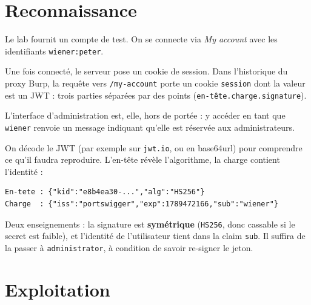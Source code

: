 \documentclass[11pt,a4paper]{article}
\begin{document}

\section{Reconnaissance}
Le lab fournit un compte de test. On se connecte via \emph{My account} avec les
identifiants \texttt{wiener:peter}.


Une fois connecté, le serveur pose un cookie de session. Dans l'historique du
proxy Burp, la requête vers \texttt{/my-account} porte un cookie
\texttt{session} dont la valeur est un JWT : trois parties séparées par des
points (\texttt{en-tête.charge.signature}).


L'interface d'administration est, elle, hors de portée : y accéder en tant que
\texttt{wiener} renvoie un message indiquant qu'elle est réservée aux
administrateurs.


On décode le JWT (par exemple sur \texttt{jwt.io}, ou en base64url) pour
comprendre ce qu'il faudra reproduire. L'en-tête révèle l'algorithme, la charge
contient l'identité :

\begin{lstlisting}
En-tete : {"kid":"e8b4ea30-...","alg":"HS256"}
Charge  : {"iss":"portswigger","exp":1789472166,"sub":"wiener"}
\end{lstlisting}


Deux enseignements : la signature est \textbf{symétrique} (\texttt{HS256}, donc
cassable si le secret est faible), et l'identité de l'utilisateur tient dans la
claim \texttt{sub}. Il suffira de la passer à \texttt{administrator}, à
condition de savoir re-signer le jeton.

\section{Exploitation}
\end{document}
